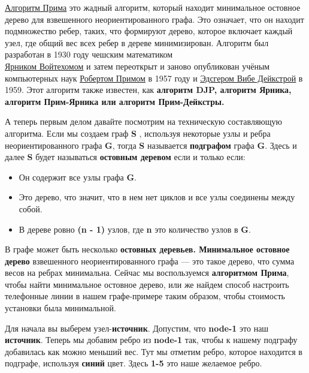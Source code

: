\vspace{\baselineskip}
\href{https://vk.cc/atMoK7}{\underline{Алгоритм Прима}} это жадный алгоритм, который находит минимальное остовное дерево для взвешенного неориентированного графа. Это означает, что он находит подмножество ребер, таких, что формируют дерево, которое включает каждый узел, где общий вес всех ребер в дереве минимизирован. Алгоритм был разработан в 1930 году чешским математиком \\ \href{https://vk.cc/atMoNq}{\underline{Ярником Войтехомом}} и затем переоткрыт и заново опубликован учёным компьютерных наук \href{https://en.wikipedia.org/wiki/Robert_C._Prim}{\underline{Робертом Примом}} в 1957 году и \href{https://vk.cc/atMoUn}{\underline{Эдсгером Вибе Дейкстрой}} в 1959. Этот алгоритм также известен, как \textbf{алгоритм DJP, алгоритм Ярника, алгоритм Прим-Ярника или алгоритм Прим-Дейкстры.}

\vspace{\baselineskip}
А теперь первым делом давайте посмотрим на техническую составляющую алгоритма. Если мы создаем граф \textbf{S} , используя некоторые узлы и ребра неориентированного графа \textbf{G}, тогда \textbf{S} называется \textbf{подграфом} графа \textbf{G}. Здесь и далее \textbf{S} будет называться \textbf{остовным деревом} если и только если:

\vspace{\baselineskip}
\begin{itemize}
  \item Он содержит все узлы графа \textbf{G}.
  \item Это дерево, что значит, что в нем нет циклов и все узлы соединены между собой.
  \item В дереве ровно \textbf{(n - 1)} узлов, где \textbf{n} это количество узлов в \textbf{G}.
\end{itemize}

\vspace{\baselineskip}
В графе может быть несколько \textbf{остовных деревьев. Минимальное остовное дерево} взвешенного неориентированного графа --- это такое дерево, что сумма весов на ребрах минимальна. Сейчас мы воспользуемся \textbf{алгоритмом Прима}, чтобы найти минимальное остовное дерево, или же найдем способ настроить телефонные линии в нашем графе-примере таким образом, чтобы стоимость установки была минимальной.

\vspace{\baselineskip}
Для начала вы выберем узел-\textbf{источник}. Допустим, что \textbf{node-1} это наш \textbf{источник}. Теперь мы добавим ребро из \textbf{node-1} так, чтобы к нашему подграфу добавилась как можно меньший вес. Тут мы отметим ребро, которое находится в подграфе, используя \textbf{синий} цвет. Здесь \textbf{1-5} это наше желаемое ребро.
